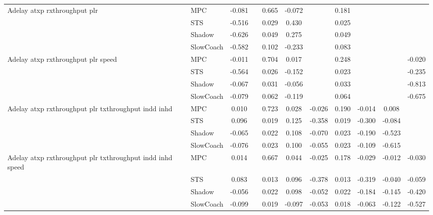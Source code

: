 \begin{tabular}{|l|l|*{9}{c|}}
\midrule
Adelay atxp rxthroughput plr    & MPC &   -0.081 &        &     0.665 & -0.072 &     &  0.181 &      &      &       \\
                              & STS &   -0.516 &        &     0.029 &  0.430 &     &  0.025 &      &      &       \\
                              & Shadow &   -0.626 &        &     0.049 &  0.275 &     &  0.049 &      &      &       \\
                              & SlowCoach &   -0.582 &        &     0.102 & -0.233 &     &  0.083 &      &      &       \\
\midrule
Adelay atxp rxthroughput plr speed    & MPC &   -0.011 &        &     0.704 &  0.017 &     &  0.248 &      &      &   -0.020 \\
                              & STS &   -0.564 &        &     0.026 & -0.152 &     &  0.023 &      &      &   -0.235 \\
                              & Shadow &   -0.067 &        &     0.031 & -0.056 &     &  0.033 &      &      &   -0.813 \\
                              & SlowCoach &   -0.079 &        &     0.062 & -0.119 &     &  0.064 &      &      &   -0.675 \\
\midrule
Adelay atxp rxthroughput plr txthroughput indd inhd    & MPC &    0.010 &        &     0.723 &  0.028 & -0.026 &  0.190 &  -0.014 &   0.008 &       \\
                              & STS &    0.096 &        &     0.019 &  0.125 & -0.358 &  0.019 &  -0.300 &  -0.084 &       \\
                              & Shadow &   -0.065 &        &     0.022 &  0.108 & -0.070 &  0.023 &  -0.190 &  -0.523 &       \\
                              & SlowCoach &   -0.076 &        &     0.023 &  0.100 & -0.055 &  0.023 &  -0.109 &  -0.615 &       \\
\midrule
Adelay atxp rxthroughput plr txthroughput indd inhd speed    & MPC &    0.014 &        &     0.667 &  0.044 & -0.025 &  0.178 &  -0.029 &  -0.012 &   -0.030 \\
                              & STS &    0.083 &        &     0.013 &  0.096 & -0.378 &  0.013 &  -0.319 &  -0.040 &   -0.059 \\
                              & Shadow &   -0.056 &        &     0.022 &  0.098 & -0.052 &  0.022 &  -0.184 &  -0.145 &   -0.420 \\
                              & SlowCoach &   -0.099 &        &     0.019 & -0.097 & -0.053 &  0.018 &  -0.063 &  -0.122 &   -0.527 \\

\end{tabular}
